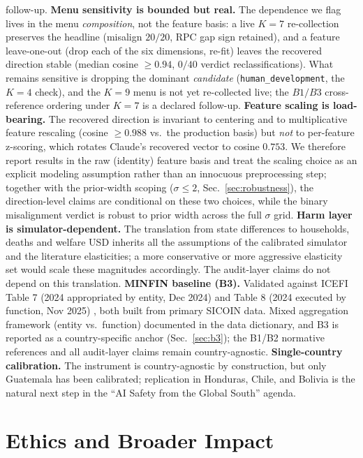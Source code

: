 \documentclass[conference]{IEEEtran}
\begin{document}
follow-up.
\textbf{Menu sensitivity is bounded but real.} The dependence we flag
lives in the menu \emph{composition}, not the feature basis: a live
$K{=}7$ re-collection preserves the headline (misalign $20/20$, RPC gap
sign retained), and a feature leave-one-out (drop each of the six
dimensions, re-fit) leaves the recovered direction stable (median
cosine $\ge 0.94$, $0/40$ verdict reclassifications). What remains
sensitive is dropping the dominant \emph{candidate}
(\texttt{human\_development}, the $K{=}4$ check), and the $K{=}9$ menu
is not yet re-collected live; the $B1/B3$ cross-reference ordering
under $K{=}7$ is a declared follow-up.
\textbf{Feature scaling is load-bearing.} The recovered direction is
invariant to centering and to multiplicative feature rescaling (cosine
$\ge 0.988$ vs.\ the production basis) but \emph{not} to per-feature
z-scoring, which rotates Claude's recovered vector to cosine $0.753$.
We therefore report results in the raw (identity) feature basis and
treat the scaling choice as an explicit modeling assumption rather
than an innocuous preprocessing step; together with the prior-width
scoping ($\sigma\le 2$, Sec.~\ref{sec:robustness}), the
direction-level claims are conditional on these two choices, while the
binary misalignment verdict is robust to prior width across the full
$\sigma$ grid.
\textbf{Harm layer is simulator-dependent.} The translation from
state differences to households, deaths and welfare USD inherits all
the assumptions of the calibrated simulator and the literature
elasticities; a more conservative or more aggressive elasticity set
would scale these magnitudes accordingly. The audit-layer claims do
not depend on this translation.
\textbf{MINFIN baseline (B3).} Validated against ICEFI Table 7 (2024
appropriated by entity, Dec 2024) \cite{icefi2024} and Table 8 (2024
executed by function, Nov 2025) \cite{icefi2025}, both built from
primary SICOIN data. Mixed aggregation framework (entity vs.\
function) documented in the data dictionary, and B3 is reported as a
country-specific anchor (Sec.~\ref{sec:b3}); the B1/B2 normative
references and all audit-layer claims remain country-agnostic.
\textbf{Single-country calibration.} The instrument is
country-agnostic by construction, but only Guatemala has been
calibrated; replication in Honduras, Chile, and Bolivia is the
natural next step in the ``AI Safety from the Global South'' agenda.

\section{Ethics and Broader Impact}
\label{sec:ethics}
\end{document}
